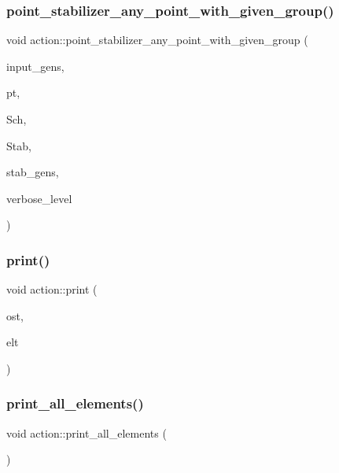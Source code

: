 \subsubsection{\texorpdfstring{point\+\_\+stabilizer\+\_\+any\+\_\+point\+\_\+with\+\_\+given\+\_\+group()}{point\_stabilizer\_any\_point\_with\_given\_group()}}
{\footnotesize\ttfamily void action\+::point\+\_\+stabilizer\+\_\+any\+\_\+point\+\_\+with\+\_\+given\+\_\+group (\begin{DoxyParamCaption}\item[{\mbox{\hyperlink{classstrong__generators}{strong\+\_\+generators}} $\ast$}]{input\+\_\+gens,  }\item[{\mbox{\hyperlink{galois_8h_a09fddde158a3a20bd2dcadb609de11dc}{I\+NT}} \&}]{pt,  }\item[{\mbox{\hyperlink{classschreier}{schreier}} $\ast$\&}]{Sch,  }\item[{\mbox{\hyperlink{classsims}{sims}} $\ast$\&}]{Stab,  }\item[{\mbox{\hyperlink{classstrong__generators}{strong\+\_\+generators}} $\ast$\&}]{stab\+\_\+gens,  }\item[{\mbox{\hyperlink{galois_8h_a09fddde158a3a20bd2dcadb609de11dc}{I\+NT}}}]{verbose\+\_\+level }\end{DoxyParamCaption})}

\mbox{\label{classaction_ae4159079fcf493e0e110c2114cc0a52d}} 
\subsubsection{\texorpdfstring{print()}{print()}}
{\footnotesize\ttfamily void action\+::print (\begin{DoxyParamCaption}\item[{ostream \&}]{ost,  }\item[{void $\ast$}]{elt }\end{DoxyParamCaption})}

\mbox{\label{classaction_ab132f662a54a4143b8442ab0d2c20c02}} 
\subsubsection{\texorpdfstring{print\+\_\+all\+\_\+elements()}{print\_all\_elements()}}
{\footnotesize\ttfamily void action\+::print\+\_\+all\+\_\+elements (\begin{DoxyParamCaption}{ }\end{DoxyParamCaption})}

